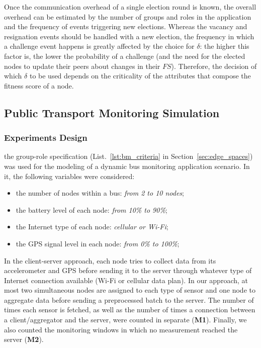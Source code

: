 
Once the communication overhead of a single election round is known, the overall overhead can be estimated by the number of groups and roles in the application and the frequency of events triggering new elections. Whereas the vacancy and resignation events should be handled with a new election, the frequency in which a challenge event happens is greatly affected by the choice for $\delta$: the higher this factor is, the lower the probability of a challenge (and the need for the elected nodes to update their peers about changes in their $FS$). Therefore, the decision of which $\delta$ to be used depends on the criticality of the attributes that compose the fitness score of a node. 



\subsection{Public Transport Monitoring Simulation}

\subsubsection{Experiments Design}

the group-role specification (List.~\ref{lst:bm_criteria} in Section~\ref{sec:edge_spaces}) was used for the modeling of a dynamic bus monitoring application scenario. In it, the following variables were considered:

\begin{itemize}
	
	\item the number of nodes within a bus: \textit{from 2 to 10 nodes};
	
	\item the battery level of each node: \textit{from 10\% to 90\%};
	
	\item the Internet type of each node: \textit{cellular or Wi-Fi};
	
	\item the GPS signal level in each node: \textit{from 0\% to 100\%};
	
\end{itemize}

In the client-server approach, each node tries to collect data from its accelerometer and GPS before sending it to the server through whatever type of Internet connection available (Wi-Fi or cellular data plan). In our approach, at most two simultaneous nodes are assigned to each type of sensor and one node to aggregate data before sending a preprocessed batch to the server. The number of times each sensor is fetched, as well as the number of times a connection between a client/aggregator and the server, were counted in separate (\textbf{M1}). Finally, we also counted the monitoring windows in which no measurement reached the server (\textbf{M2}).

